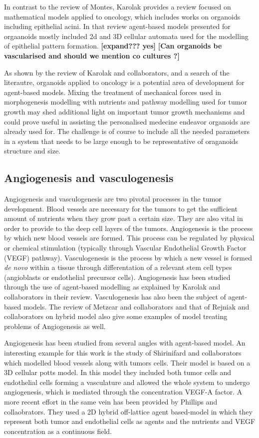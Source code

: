 \documentclass[11pt,a4paper]{article}
\begin{document}
In contrast to the review of Montes, Karolak provides a review focused on mathematical models applied to oncology, which includes works on organoids including epithelial acini.\cite{Karolak2018} In that review agent-based models presented for orgaanoids mostly included 2d and 3D cellular automata used for the modelling of epithelial pattern formation. \textbf{[expand??? yes]} \textbf{[Can organoids be vascularised and should we mention co cultures ?]}

As shown by the review of Karolak and collaborators, and a search of the literautre, organoids applied to oncology is a potential area of development for agent-based models. Mixing the treatment of mechanical forces used in morphogenesis modelling with nutrients and pathway modelling used for tumor growth may shed additional light on important tumor growth mechanisms and could prove useful in assisting the personalised medecine endeavor organoids are already used for. The challenge is of course to include all the needed parameters in a system that needs to be large enough to be representative of oraganoids structure and size. 

\subsection{Angiogenesis and vasculogenesis}
Angiogenesis and vasculogenesis are two pivotal processes in the tumor development. Blood vessels are necessary for the tumors to get the sufficient amount of nutrients when they grow past a certain size. They are also vital in order to provide to the deep cell layers of the tumors. Angiogenesis is the process by which new blood vessels are formed. This process can be regulated by physical or chemical stimulation (typically through Vascular Endothelial Growth Factor (VEGF) pathway). Vasculogenesis is the process by which a new vessel is formed \textit{de novo} within a tissue through differentation of a relevant stem cell types (angioblasts or endothelial precursor cells)\cite{Karolak2018}\cite{Secomb2013}. Angiogenesis has been studied through the use of agent-based modelling as explained by Karolak and collaborators in their review. Vasculogenesis has also been the subject of agent-based models. The review of Metzcar and collaborators and that of Rejniak and collaborators on hybrid model also give some examples of model treating problems of Angiogenesis as well.\cite{Metzcar2019}\cite{Chamseddine2019}

Angiogenesis has been studied from several angles with agent-based model. An interesting example for this work is the study of Shirinifard and collaborators which modelled blood vessels along with tumors cells.\cite{Shirinifard2009} Their model is based on a 3D cellular potts model. In this model they included both tumor cells and endothelial cells forming a vasculature and allowed the whole system to undergo angiogenesis, which is mediated through the concentration VEGF-A factor. A more recent effort in the same vein has been provided by  Phillips and collaobrators.\cite{Phillips2020} They used a 2D hybrid off-lattice agent based-model in which they represent both tumor and endothelial cells as agents and the nutrients and VEGF concentration as a continuous field. 
\end{document}
